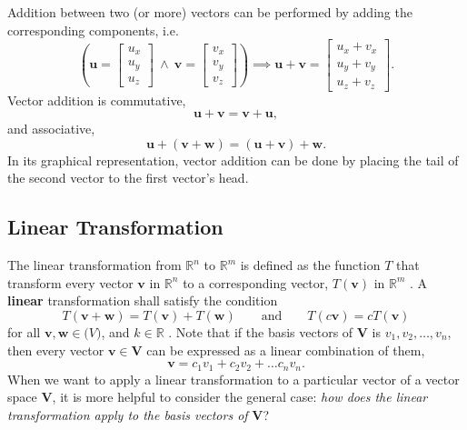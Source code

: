 \documentclass[conference]{IEEEtran}
\begin{document}
Addition between two (or more) vectors can be performed by adding the corresponding components, i.e.
\begin{equation}
    \left( \mathbf{u} = \begin{bmatrix} u_x \\ u_y \\ u_z \end{bmatrix} \ \land \ \mathbf{v} = \begin{bmatrix} v_x \\ v_y \\ v_z \end{bmatrix} \right) \implies \mathbf{u} + \mathbf{v} = \begin{bmatrix} u_x + v_x \\ u_y + v_y \\ u_z + v_z \end{bmatrix}. 
\end{equation}
Vector addition is commutative,
\begin{equation}
    \mathbf{u} + \mathbf{v} = \mathbf{v} + \mathbf{u},
\end{equation}
and associative,
\begin{equation}
    \mathbf{u} + (\mathbf{v} + \mathbf{w}) = (\mathbf{u} + \mathbf{v}) + \mathbf{w}.
\end{equation}
In its graphical representation, vector addition can be done by placing the tail of the second vector to the first vector's head.


\subsection{Linear Transformation} 
The linear transformation from $\mathbb{R}^n$ to $\mathbb{R}^m$ is defined as the function $T$ that transform every vector $\mathbf{v}$ in $\mathbb{R}^n$ to a corresponding vector, $T(\mathbf{v})$ in $\mathbb{R}^m$ \cite{strang}. A \textbf{linear} transformation shall satisfy the condition
\begin{equation}
    T(\mathbf{v} + \mathbf{w}) = T(\mathbf{v}) + T(\mathbf{w}) \qquad \text{and} \qquad T(c\mathbf{v}) = cT(\mathbf{v}) 
\end{equation}
for all $\mathbf{v}, \mathbf{w} \in \mathbf(V)$, and $k \in \mathbb{R}$ \cite{strang}. Note that if the basis vectors of $\mathbf{V}$ is $v_1, v_2, \ldots, v_n$, then every vector $\mathbf{v} \in \mathbf{V}$ can be expressed as a linear combination of them,
\begin{equation}
    \mathbf{v} = c_1 v_1 + c_2 v_2 + \ldots c_n v_n.
\end{equation}
When we want to apply a linear transformation to a particular vector of a vector space $\mathbf{V}$, it is more helpful to consider the general case: \textit{how does the linear transformation apply to the basis vectors of} $\mathbf{V}$? 
\end{document}
